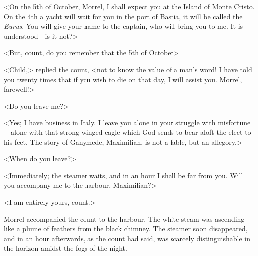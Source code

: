  <On the 5th of October, Morrel, I shall expect you at the Island of Monte Cristo. On the 4th a yacht will wait for you in the port of Bastia, it will be called the \textit{Eurus}. You will give your name to the captain, who will bring you to me. It is understood—is it not?> 

 <But, count, do you remember that the 5th of October\longdash> 

 <Child,> replied the count, <not to know the value of a man's word! I have told you twenty times that if you wish to die on that day, I will assist you. Morrel, farewell!> 

 <Do you leave me?> 

 <Yes; I have business in Italy. I leave you alone in your struggle with misfortune—alone with that strong-winged eagle which God sends to bear aloft the elect to his feet. The story of Ganymede, Maximilian, is not a fable, but an allegory.> 

 <When do you leave?> 

 <Immediately; the steamer waits, and in an hour I shall be far from you. Will you accompany me to the harbour, Maximilian?>

<I am entirely yours, count.> 

 Morrel accompanied the count to the harbour. The white steam was ascending like a plume of feathers from the black chimney. The steamer soon disappeared, and in an hour afterwards, as the count had said, was scarcely distinguishable in the horizon amidst the fogs of the night. 